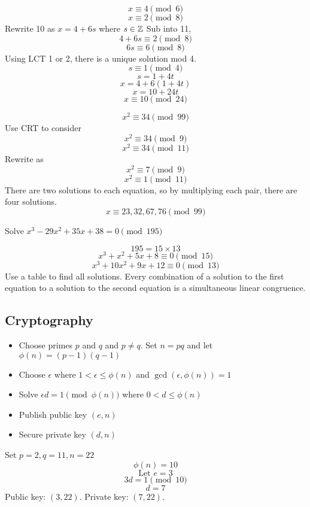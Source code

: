\documentclass[english, 12pt]{article}
\begin{document}
\begin{exmp}
\begin{equation}
x \equiv 4 \pmod 6
\end{equation}
\begin{equation}
x \equiv 2 \pmod 8
\end{equation}
Rewrite 10 as $x = 4 + 6s$ where $s \in {\mathbb{Z}}$ Sub into 11, 
\[ 4 + 6s \equiv 2 \pmod 8\]
\[ 6s \equiv 6 \pmod 8 \]
Using LCT 1 or 2, there is a unique solution mod 4.
\[s \equiv 1 \pmod 4 \]
\[s = 1 + 4t\]
\[x = 4 + 6(1 + 4t) \]
\[x = 10 + 24t \]
\[x \equiv 10 \pmod{24} \]
\end{exmp}
\begin{exmp}
\[x^2 \equiv 34 \pmod{99} \]
Use CRT to consider 
\[x^2 \equiv 34 \pmod 9\]
\[x^2 \equiv 34 \pmod {11} \]
Rewrite as
 \[x^2 \equiv 7 \pmod 9\]
\[x^2 \equiv 1 \pmod {11} \]
There are two solutions to each equation, so by multiplying each pair, there are four solutions.
\[x \equiv 23,32,67,76 \pmod {99} \]
\end{exmp}
\begin{exmp}
Solve $x^3 - 29x^2 + 35x + 38 = 0 \pmod{195}$
\begin{sol}
\[ 195 = 15 \times 13 \]
\[x^3 + x^2 + 5x + 8 \equiv 0 \pmod{15} \]
\[ x^3 + 10x^2 + 9x +12 \equiv 0 \pmod{13} \]
Use a table to find all solutions. Every combination of a solution to the first equation to a solution to the second equation is a simultaneous linear congruence.
\end{sol}
\end{exmp}
\subsection{Cryptography}
\begin{itemize}
\item Choose primes $p$ and $q$ and $p \neq q$. Set $n = pq$ and let $\phi(n) = (p-1)(q-1)$
\item Choose $\epsilon$ where $ 1 < \epsilon \leq \phi(n)$ and $\gcd(\epsilon, \phi(n)) = 1$
\item Solve $\epsilon d = 1 \pmod{\phi(n)}$ where $ 0 < d \leq \phi(n)$
\item Publish public key $(e,n)$
\item Secure private key $(d,n)$
\end{itemize}
\begin{exmp}
Set $p=2,q=11, n = 22$
\[ \phi(n) = 10 \]
\[\text{Let } e=3 \]
\[ 3d = 1 \pmod{10} \]
\[ d = 7 \]
Public key: $(3, 22)$. Private key: $(7,22)$.
\end{exmp}
\end{document}
